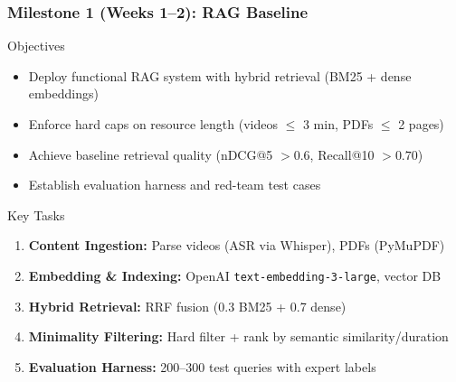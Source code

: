 \documentclass[aspectratio=169]{beamer}
\begin{document}
\begin{frame}
\frametitle{Milestone 1 (Weeks 1--2): RAG Baseline}
\begin{block}{Objectives}
\begin{itemize}
\item Deploy functional RAG system with hybrid retrieval (BM25 + dense embeddings)
\item Enforce hard caps on resource length (videos $\leq$ 3 min, PDFs $\leq$ 2 pages)
\item Achieve baseline retrieval quality (nDCG@5 $> 0.6$, Recall@10 $> 0.70$)
\item Establish evaluation harness and red-team test cases
\end{itemize}
\end{block}

\begin{block}{Key Tasks}
\begin{enumerate}
\item \textbf{Content Ingestion:} Parse videos (ASR via Whisper), PDFs (PyMuPDF)
\item \textbf{Embedding \& Indexing:} OpenAI \texttt{text-embedding-3-large}, vector DB
\item \textbf{Hybrid Retrieval:} RRF fusion (0.3 BM25 + 0.7 dense)
\item \textbf{Minimality Filtering:} Hard filter + rank by semantic similarity/duration
\item \textbf{Evaluation Harness:} 200--300 test queries with expert labels
\end{enumerate}
\end{block}
\end{frame}
\end{document}
